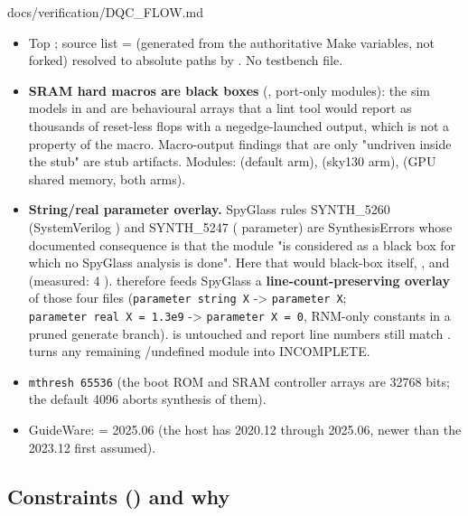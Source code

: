 \begin{relocated}{docs/verification/DQC_FLOW.md}
\begin{itemize}
\tightlist
\item
  Top ; source list = 
  (generated from the authoritative Make variables, not forked) resolved
  to absolute paths by . No testbench
  file.
\item
  \textbf{SRAM hard macros are black boxes} (,
  port-only modules): the sim models in  and 
  are behavioural arrays that a lint tool would report as thousands of
  reset-less flops with a negedge-launched output, which is not a
  property of the macro. Macro-output findings that are only "undriven
  inside the stub" are stub artifacts. Modules:
   (default arm), 
  (sky130 arm),  (GPU shared memory, both
  arms).
\item
  \textbf{String/\allowbreak{}real parameter overlay.} SpyGlass rules
  SYNTH\_\allowbreak{}5260 (SystemVerilog ) and
  SYNTH\_\allowbreak{}5247 ( parameter) are SynthesisErrors
  whose documented consequence is that the module "is considered as a
  black box for which no SpyGlass analysis is done". Here that would
  black-box  itself, ,
   and  (measured: 4
  ).  therefore feeds
  SpyGlass a \textbf{line-count-preserving overlay} of those four files
  (\texttt{parameter\ string\ X} -\textgreater{} \texttt{parameter\ X};
  \texttt{parameter\ real\ X\ =\allowbreak{}\ 1.\allowbreak{}3e9}
  -\textgreater{} \texttt{parameter\ X\ =\allowbreak{}\ 0}, RNM-only
  constants in a pruned generate branch).  is untouched and
  report line numbers still match .  turns
  any remaining /\allowbreak{}undefined module
  into INCOMPLETE.
\item
  \texttt{mthresh\ 65536} (the boot ROM and SRAM controller arrays are
  32768 bits; the default 4096 aborts synthesis of them).
\item
  GuideWare:  = 2025.06  (the host
  has 2020.12 through 2025.06, newer than the 2023.12 first assumed).
\end{itemize}

\subsection{\texorpdfstring{Constraints ()
and why}{Constraints () and why}}\label{um:flow:dqc:constraints-dqcsgdcsoc-topsgdc-and-why}


\end{relocated}
